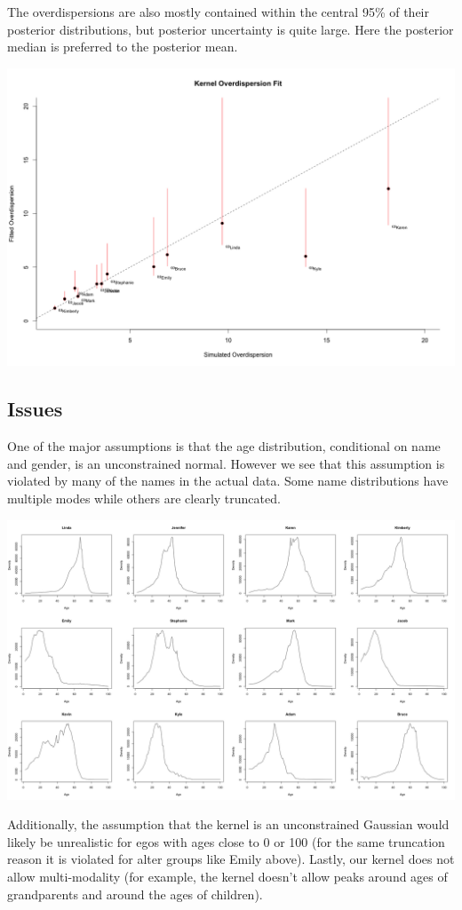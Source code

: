 \documentclass[12pt]{article}
\begin{document}
\noindent The overdispersions are also mostly contained within the central 95\% of their posterior distributions, but posterior uncertainty is quite large. Here the posterior median is preferred to the posterior mean.

\includegraphics[scale = 0.38]{Overdispersion_Estimates.png}

\pagebreak
\subsection*{Issues}
One of the major assumptions is that the age distribution, conditional on name and gender, is an unconstrained normal. However we see that this assumption is violated by many of the names in the actual data. Some name distributions have multiple modes while others are clearly truncated.

\noindent \includegraphics[width=\textwidth]{Name_Age_Histograms.png}

\noindent Additionally, the assumption that the kernel is an unconstrained Gaussian would likely be unrealistic for egos with ages close to 0 or 100 (for the same truncation reason it is violated for alter groups like Emily above). Lastly, our kernel does not allow multi-modality (for example, the kernel doesn't allow peaks around ages of grandparents and around the ages of children).
\end{document}
